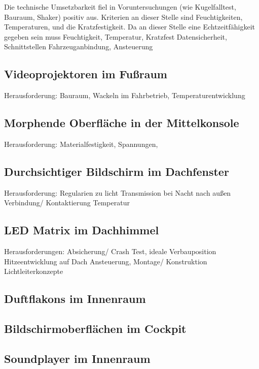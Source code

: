 Die technische Umsetzbarkeit fiel in Voruntersuchungen (wie Kugelfalltest, Bauraum, Shaker) positiv aus.
Kriterien an dieser Stelle sind Feuchtigkeiten, Temperaturen, und die Kratzfestigkeit.
Da an dieser Stelle eine Echtzeitfähigkeit gegeben sein muss
Feuchtigkeit, Temperatur, Kratzfest
Datensicherheit, Schnittstellen
Fahrzeuganbindung, Ansteuerung

\subsection{Videoprojektoren im Fußraum}
Herausforderung:
Bauraum, Wackeln im Fahrbetrieb, Temperaturentwicklung
\subsection{Morphende Oberfläche in der Mittelkonsole}
Herausforderung:
Materialfestigkeit, Spannungen,

\subsection{Durchsichtiger Bildschirm im Dachfenster}
Herausforderung:
Regularien zu licht Transmission bei Nacht nach außen
Verbindung/ Kontaktierung
Temperatur
\subsection{LED Matrix im Dachhimmel}
Herausforderungen:
Absicherung/ Crash Test, ideale Verbauposition
Hitzeentwicklung auf Dach
Ansteuerung, Montage/ Konstruktion
Lichtleiterkonzepte
\subsection{Duftflakons im Innenraum}
\subsection{Bildschirmoberflächen im Cockpit}
\subsection{Soundplayer im Innenraum}
